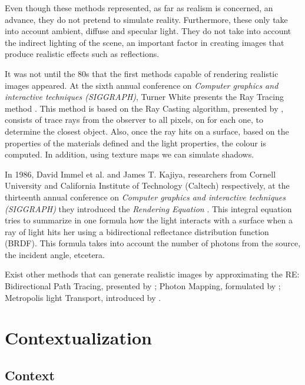 \documentclass[titlepage,12pt]{report}
\begin{document}
Even though these methods represented, as far as realism is concerned, an advance, they do not pretend to simulate reality. Furthermore, these only take into account ambient, diffuse and specular light. They do not take into account the indirect lighting of the scene, an important factor in creating images that produce realistic effects such as reflections.

It was not until the 80s that the first methods capable of rendering realistic images appeared. At the sixth annual conference on \textit{Computer graphics and interactive techniques (SIGGRAPH)}, Turner White presents the Ray Tracing method \citep[pp.~343--349]{Whitted1980}. This method is based on the Ray Casting algorithm, presented by \citep[pp.~37--45]{Appel1968}, consists of trace rays from the observer to all pixels, on for each one, to determine the closest object. Also, once the ray hits on a surface, based on the properties of the materials defined and the light properties, the colour is computed. In addition, using texture maps we can simulate shadows.

In 1986, David Immel et al. and James T. Kajiya, researchers from Cornell University and California Institute of Technology (Caltech) respectively, at the thirteenth annual conference on \textit{Computer graphics and interactive techniques (SIGGRAPH)} they introduced the \textit{Rendering Equation} \citep[pp.~143--150, pp.~133--142]{Kajiya1986, Immel1986}. This integral equation tries to summarize in one formula how the light interacts with a surface when a ray of light hits her using a bidirectional reflectance distribution function (BRDF). This formula takes into account the number of photons from the source, the incident angle, etcetera.

Exist other methods that can generate realistic images by approximating the RE: Bidirectional Path Tracing, presented by \citep[pp.~145--153]{Lafortune1993}; Photon Mapping, formulated by \citep[pp. ~21--30]{Jensen1996}; Metropolis light Transport, introduced by \citep[pp. ~65--76]{Veach1997}.

\newpage

\section{Contextualization}

\subsection{Context}
\end{document}
